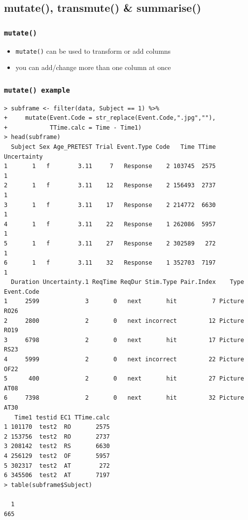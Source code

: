 \documentclass[xcolor={table},c]{beamer}
\begin{document}
\subsection{mutate(), transmute() \& summarise()}
\begin{frame}[fragile]\frametitle{\texttt{mutate()}}
  \begin{itemize}
  \item \texttt{mutate()} can be used to transform or add columns
  \item you can add/change more than one column at once
  \end{itemize}
\end{frame}


\begin{frame}[fragile]\frametitle{\texttt{mutate() example}}\tiny
\begin{verbatim}
> subframe <- filter(data, Subject == 1) %>%
+     mutate(Event.Code = str_replace(Event.Code,".jpg",""),
+            TTime.calc = Time - Time1)
> head(subframe)
  Subject Sex Age_PRETEST Trial Event.Type Code   Time TTime Uncertainty
1       1   f        3.11     7   Response    2 103745  2575           1
2       1   f        3.11    12   Response    2 156493  2737           1
3       1   f        3.11    17   Response    2 214772  6630           1
4       1   f        3.11    22   Response    1 262086  5957           1
5       1   f        3.11    27   Response    2 302589   272           1
6       1   f        3.11    32   Response    1 352703  7197           1
  Duration Uncertainty.1 ReqTime ReqDur Stim.Type Pair.Index    Type Event.Code
1     2599             3       0   next       hit          7 Picture       RO26
2     2800             2       0   next incorrect         12 Picture       RO19
3     6798             2       0   next       hit         17 Picture       RS23
4     5999             2       0   next incorrect         22 Picture       OF22
5      400             2       0   next       hit         27 Picture       AT08
6     7398             2       0   next       hit         32 Picture       AT30
   Time1 testid EC1 TTime.calc
1 101170  test2  RO       2575
2 153756  test2  RO       2737
3 208142  test2  RS       6630
4 256129  test2  OF       5957
5 302317  test2  AT        272
6 345506  test2  AT       7197
> table(subframe$Subject)

  1 
665   
\end{verbatim}
\end{frame}
\end{document}
